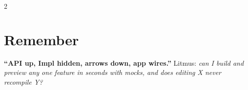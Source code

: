 \documentclass[8pt]{extarticle}
\begin{document}
\begin{multicols}{2}
\section{Remember}
\textbf{``API up, Impl hidden, arrows down, app wires.''} Litmus: \emph{can I build and
preview any one feature in seconds with mocks, and does editing X never recompile Y?}


\end{multicols}

\end{document}
